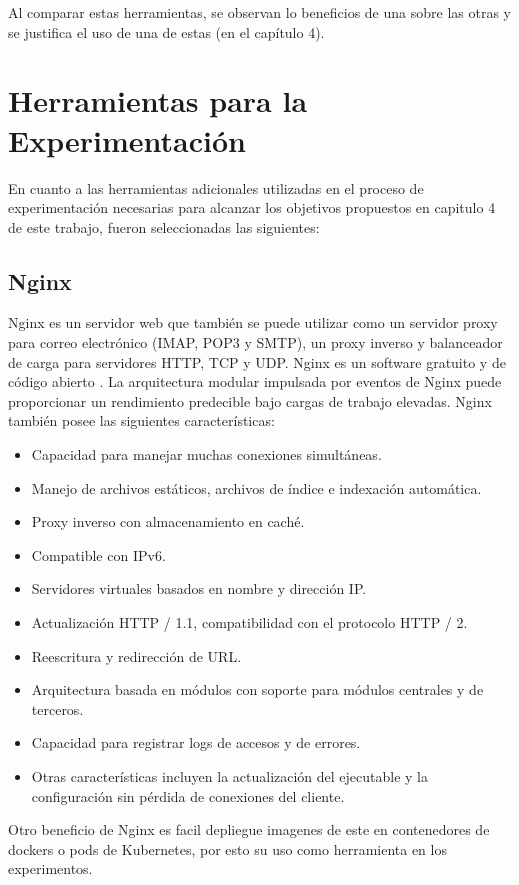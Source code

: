 \begin{enumerate}
\end{enumerate}

\par Al comparar estas herramientas, se observan lo beneficios de una sobre las otras  y se justifica el uso de una de estas (en el cap\'itulo 4).

\section{Herramientas para la Experimentación}

\par En cuanto a las herramientas adicionales utilizadas en el proceso de experimentación necesarias para alcanzar los objetivos propuestos en capitulo 4 de este trabajo, fueron seleccionadas las siguientes:\\

\subsection{Nginx}

\par Nginx es un servidor web que también se puede utilizar como un servidor proxy para correo electrónico (IMAP, POP3 y SMTP), un proxy inverso y balanceador de carga para servidores HTTP, TCP y UDP. Nginx es un software gratuito y de código abierto \cite{WEB01}. La arquitectura modular impulsada por eventos de Nginx puede proporcionar un rendimiento predecible bajo cargas de trabajo elevadas. Nginx también posee las siguientes características:\\
\vspace{\baselineskip}
\begin{itemize}
    \item Capacidad para manejar muchas conexiones simultáneas.
    \item Manejo de archivos estáticos, archivos de índice e indexación automática.
    \item Proxy inverso con almacenamiento en caché.
    \item Compatible con IPv6.
    \item Servidores virtuales basados en nombre y dirección IP.
    \item Actualización HTTP / 1.1, compatibilidad con el protocolo HTTP / 2.
    \item Reescritura y redirección de URL.
    \item Arquitectura basada en módulos con soporte para módulos centrales y de terceros.
    \item Capacidad para registrar logs de accesos y de errores.
    \item Otras características incluyen la actualización del ejecutable y la configuración sin pérdida de conexiones del cliente.
\end{itemize}

\par Otro beneficio de Nginx es facil depliegue imagenes de este en contenedores de dockers o pods de Kubernetes, por esto su uso como herramienta en los experimentos.\\



